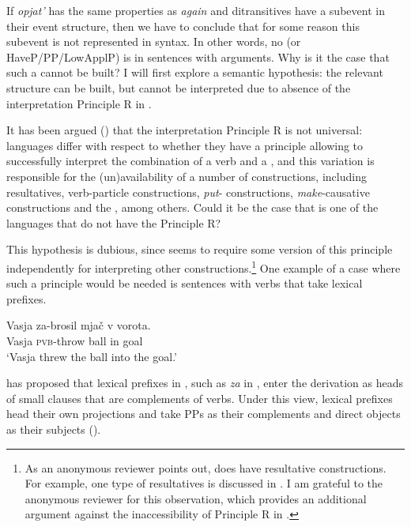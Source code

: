 \documentclass[output=paper]{langscibook}
\begin{document}
If  \textit{opjat’} has the same properties as  \textit{again} and  ditransitives have a  subevent in their event structure, then we have to conclude that for some reason this  subevent is not represented in syntax. In other words, no  (or HaveP\slash PP\slash LowApplP) is  in   sentences with  arguments. Why is it the case that such a  cannot be built? I will first explore a semantic hypothesis: the relevant structure can be built, but cannot be interpreted due to absence of the interpretation Principle R in .



It has been argued (\citealt{Snyder2001,Beck-Snyder2001,Beck2005}) that the interpretation Principle R is not universal: languages differ with respect to whether they have a principle allowing to successfully interpret the combination of a verb and a , and this variation is responsible for the (un)availability of a number of constructions, including resultatives, verb-particle constructions, \textit{put}{}- constructions, \textit{make}{}-causative constructions and the , among others. Could it be the case that  is one of the languages that do not have the Principle R?



This hypothesis is dubious, since  seems to require some version of this principle independently for interpreting other constructions.\footnote{As an anonymous reviewer points out,  does have resultative constructions. For example, one type of  resultatives is discussed in \citet{Tatevosov2010}. I am grateful to the anonymous reviewer for this observation, which provides an additional argument against the inaccessibility of Principle R in .} One example of a case where such a principle would be needed is sentences with verbs that take lexical prefixes.


 \ea\label{ex:bondarenko:29}
\gll Vasja za-brosil mjač v vorota.\\
     Vasja \textsc{pvb}-throw ball in goal\\
\glt `Vasja threw the ball into the goal.'
\z


\noindent \citet{Svenonius2004} has proposed that lexical prefixes in , such as \textit{za} in , enter the derivation as heads of small clauses that are complements of verbs. Under this view, lexical prefixes head their own projections and take PPs as their complements and direct objects as their subjects ().
\end{document}
